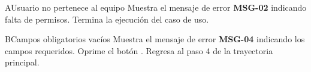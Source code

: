 \begin{UCtrayectoriaA}{A}{Usuario no pertenece al equipo}
	\UCpaso Muestra el mensaje de error \textbf{MSG-02} indicando falta de permisos.
	\UCpaso Termina la ejecución del caso de uso.
\end{UCtrayectoriaA}

\begin{UCtrayectoriaA}{B}{Campos obligatorios vacíos}
	\UCpaso Muestra el mensaje de error \textbf{MSG-04} indicando los campos requeridos.
	\UCpaso[\UCactor] Oprime el botón .
	\UCpaso Regresa al paso 4 de la trayectoria principal.
\end{UCtrayectoriaA}

